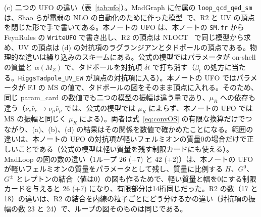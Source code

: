 \documentclass[a4paper,10pt]{ltjsarticle}
\newcommand{\MSbar}{\overline{\mathrm{MS}}}
\begin{document}
(c) 二つの UFO の違い（表~\ref{tab:ufo}）。MadGraph に付属の \texttt{loop\_qcd\_qed\_sm} は、Shao らが電弱の NLO の自動化のために作った模型~\cite{mg5ew}で、R2 と UV の頂点を閉じた形で手で書いてある。本ノートの UFO は、本ノートの \texttt{SM.fr} から FeynRules の \texttt{WriteUFO} で書き出し、R2 の頂点は NLOCT~\cite{nloct} で同じ模型から求め、UV の頂点は (d) の対抗項のラグランジアンとタドポールの頂点である。物理的な違いは繰り込みのスキームにある。公式の模型ではパラメータが on-shell の質量と $\alpha(M_Z)$ で、タドポールを対抗項 $\delta t$ で打ち消す（$\beta_t$ の処方に当たる。\texttt{HiggsTadpole\_UV\_EW} が頂点の対抗項に入る）。本ノートの UFO ではパラメータが FJ の $\MSbar$ の値で、タドポールの図をそのまま頂点に入れる。そのため、同じ param\_card の数値でも二つの模型の振幅は違う量であり、$\mu_R$ への依存も違う（$\nu_e\bar\nu_e\to\nu_\mu\bar\nu_\mu$ では、公式の模型では $\mu_R$ によらず、本ノートの UFO では $\MSbar$ の振幅と同じく $\mu_R$ による）。両者は式~\eqref{eq:convOS} の有限な換算だけでつながり、(a)、(b)、(d) の結果はその関係を数値で確かめたことになる。範囲の違いは、本ノートの UFO の対抗項が軽いフェルミオンの質量0の場合だけで正しいことである（公式の模型は軽い質量を残す制限カードにも使える）。MadLoop の図の数の違い（1ループ 26 (+7) と 42 (+2)）は、本ノートの UFO が軽いフェルミオンの質量をパラメータとして残し、質量に比例する $H$、$G^0$、$G^\pm$ とレプトンの結合（値は0）の図も作るためで、軽い質量と幅を0にする制限カードを与えると 26 (+7) になり、有限部分は14桁同じだった。R2 の数（17 と 18）の違いは、R2 の結合を内線の粒子ごとにどう分けるかの違い（対抗項の振幅の数 23 と 24）で、ループの図そのものは同じである。
\end{document}

